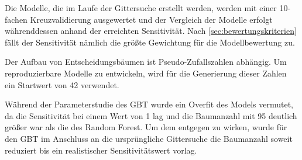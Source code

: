 Die Modelle, die im Laufe der Gittersuche erstellt werden, werden mit einer 10-fachen Kreuzvalidierung ausgewertet und der Vergleich der Modelle erfolgt währenddessen anhand der erreichten Sensitivität. Nach \cref{sec:bewertungskriterien} fällt der Sensitivität nämlich die größte Gewichtung für die Modellbewertung zu.

Der Aufbau von Entscheidungsbäumen ist Pseudo-Zufallszahlen abhängig. Um reproduzierbare Modelle zu entwickeln, wird für die Generierung dieser Zahlen ein Startwert von \num{42} verwendet.

Während der Parameterstudie des GBT wurde ein Overfit des Models vermutet, da die Sensitivität bei einem Wert von \num{1} lag und die Baumanzahl mit \num{95} deutlich größer war als die des Random Forest. Um dem entgegen zu wirken, wurde für den GBT im Anschluss an die ursprüngliche Gittersuche die Baumanzahl soweit reduziert bis ein realistischer Sensitivitätswert vorlag.
